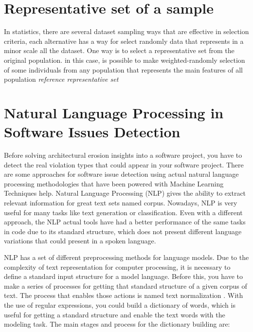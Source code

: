 \newpage

\section{Representative set of a sample}
In statistics, there are several dataset sampling ways that are effective in selection criteria, each alternative has a way for select randomly data that represents in a minor scale all the dataset. One way is to select a representative set from the original population. in this case, is possible to make weighted-randomly selection of some individuals from any population that represents the main features of all population \emph{reference representative set}

\section{Natural Language Processing in Software Issues Detection}
Before solving architectural erosion insights into a software project, you have to detect the real violation types that could appear in your software project. There are some approaches for software issue detection using actual natural language processing methodologies that have been powered with Machine Learning Techniques help. Natural Language Processing (NLP) gives the ability to extract relevant information for great text sets named corpus. Nowadays, NLP is very useful for many tasks like text generation or classification. Even with a different approach, the NLP actual tools have had a better performance of the same tasks in code due to its standard structure, which does not present different language variations that could present in a spoken language.

NLP has a set of different preprocessing methods for language models. Due to the complexity of text representation for computer processing, it is necessary to define a standard input structure for a model language. Before this, you have to make a series of processes for getting that standard structure of a given corpus of text. The process that enables those actions is named text normalization \citet{nlp-fundamentals}. With the use of regular expressions, you could build a dictionary of words, which is useful for getting a standard structure and enable the text words with the modeling task. The main stages and process for the dictionary building are:

